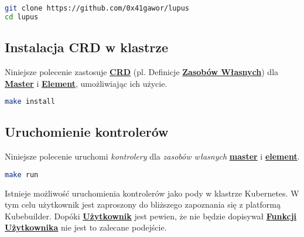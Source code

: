 \begin{lstlisting}[language=bash, caption={Klonowanie repozytorium}]
git clone https://github.com/0x41gawor/lupus
cd lupus
\end{lstlisting}

\subsection{Instalacja CRD w klastrze}

Niniejsze polecenie zastosuje \hyperlink{def:crd}{\textbf{CRD}} (pl. Definicje \hyperlink{def:zasoby-wlasne}{\textbf{Zasobów Własnych}}) dla \hyperlink{def:master}{\textbf{Master}} i \hyperlink{def:element}{\textbf{Element}}, umożliwiając ich użycie.

\begin{lstlisting}[language=bash, caption={Instalacja CRD}]
make install
\end{lstlisting}

\subsection{Uruchomienie kontrolerów }

Niniejsze polecenie uruchomi \textit{kontrolery} dla \textit{zasobów własnych} \hyperlink{def:master}{\textbf{master}} i \hyperlink{def:element}{\textbf{element}}.

\begin{lstlisting}[language=bash, caption={Uruchomienie kontrolerów}]
make run
\end{lstlisting}

Istnieje możliwość uruchomienia kontrolerów jako pody w klastrze Kubernetes. W tym celu użytkownik jest zaproszony do bliższego zapoznania się z platformą Kubebuilder. Dopóki \hyperlink{def:uzytkownik}{\textbf{Użytkownik}} jest pewien, że nie będzie dopisywał \hyperlink{def:funkcje-uzytkownika}{\textbf{Funkcji Użytkownika}} nie jest to zalecane podejście. 


